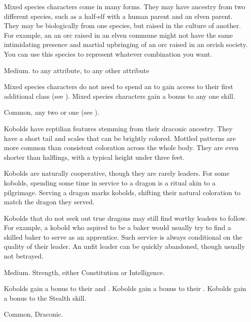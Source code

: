 
  Mixed species characters come in many forms.
  They may have ancestry from two different species, such as a half-elf with a human parent and an elven parent.
  They may be biologically from one species, but raised in the culture of another.
  For example, an an orc raised in an elven commune might not have the same intimidating presence and martial upbringing of an orc raised in an orcish society.
  You can use this species to represent whatever combination you want.

   Medium.
    to any attribute,  to any other attribute
  \begin{raggeditemize}
     Mixed species characters do not need to spend an  to gain access to their first additional class (see ).
     Mixed species characters gain a  bonus to any one skill.
  \end{raggeditemize}
   Common, any two  or one  (see ).


  Kobolds have reptilian features stemming from their draconic ancestry.
  They have a short tail and scales that can be brightly colored.
  Mottled patterns are more common than consistent coloration across the whole body.
  They are even shorter than halflings, with a typical height under three feet.

  Kobolds are naturally cooperative, though they are rarely leaders.
  For some kobolds, spending some time in service to a dragon is a ritual akin to a pilgrimage.
  Serving a dragon marks kobolds, shifting their natural coloration to match the dragon they served.

  Kobolds that do not seek out true dragons may still find worthy leaders to follow.
  For example, a kobold who aspired to be a baker would usually try to find a skilled baker to serve as an apprentice.
  Such service is always conditional on the quality of their leader.
  An unfit leader can be quickly abandoned, though usually not betrayed.

   Medium.
    Strength, either  Constitution or  Intelligence.
  \begin{raggeditemize}
     Kobolds gain a  bonus to their  and .
     Kobolds gain a  bonus to their .
     Kobolds gain a  bonus to the Stealth skill.
  \end{raggeditemize}
   Common, Draconic.

